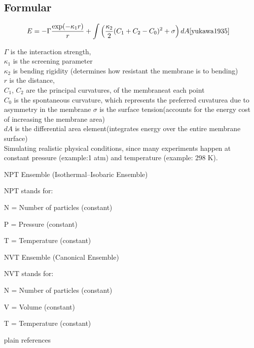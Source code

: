 \documentclass[12pt]{article}
\begin{document}
\begin{flushleft}
\subsection*{Formular}


\begin{equation}
E = -\Gamma \frac{\exp(-\kappa_1 r)}{r} + \int \left( \frac{\kappa_2}{2} (C_1 + C_2 - C_0)^2 + \sigma \right) dA \cite{yukawa1935}
\end{equation}

\(\Gamma\) is the interaction strength,\\
\(\kappa_1\) is the screening parameter \\
\(\kappa_2\) is bending rigidity (determines how resistant the membrane is to bending) \\
\(r\) is the distance, \\
\(C_1\), \(C_2\) are the principal curvatures, of the membraneat each point\\
\(C_0\) is the spontaneous curvature, which represents the preferred cuvaturea due to asymmetry in the membrane
\(\sigma\) is the surface tension(accounts for the energy cost of increasing the membrane area)\\
\(dA\) is the differential area element(integrates energy over the entire membrane surface)\\



Simulating realistic physical conditions, since many experiments happen at constant pressure (example:1 atm) and temperature  (example: 298 K).

\noindent NPT Ensemble (Isothermal–Isobaric Ensemble)

NPT stands for:

    N = Number of particles (constant)

    P = Pressure (constant)

    T = Temperature (constant)

\noindent NVT Ensemble (Canonical Ensemble)

NVT stands for:

    N = Number of particles (constant)

    V = Volume (constant)

    T = Temperature (constant)



\end{flushleft}

 {plain}  
 {references}  
\end{document}
